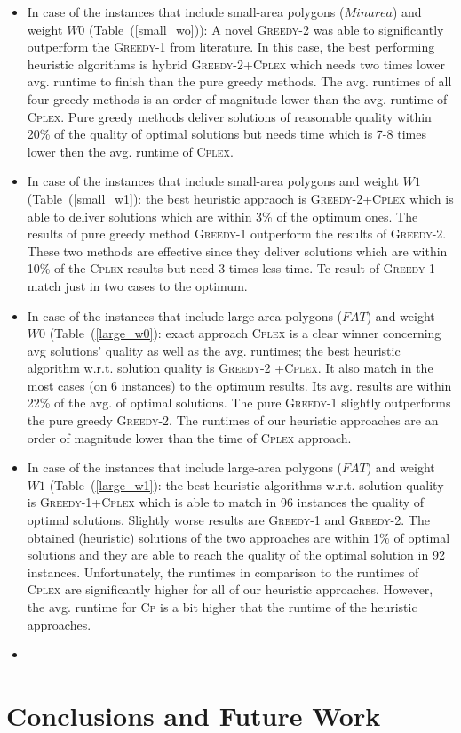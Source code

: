 \documentclass[runningheads,a4paper]{elsarticle}
\begin{document}
     \begin{itemize}
     	\item  In case of the instances that include small-area polygons ($Minarea$) and weight $W0$ (Table~(\ref{small_wo})): A novel \textsc{Greedy-2} was able to significantly outperform the \textsc{Greedy-1} from literature. In this case, the best performing heuristic algorithms is hybrid \textsc{Greedy-2+Cplex} which needs two times lower avg. runtime to finish than the pure greedy methods. The avg. runtimes of all four greedy methods is an order of magnitude lower than the avg. runtime of \textsc{Cplex}. Pure greedy methods deliver solutions of reasonable quality within 20\% of the quality of optimal solutions but needs time which is 7-8 times lower then the avg. runtime of \textsc{Cplex}. 
     	\item  In case of the instances that include small-area polygons and weight $W1$ (Table~(\ref{small_w1}): the best heuristic appraoch is \textsc{Greedy-2+Cplex} which is able to deliver solutions which are within 3\% of the optimum ones. 
     	The results of pure greedy method \textsc{Greedy-1} outperform the results of \textsc{Greedy-2}. These two methods are effective since they deliver solutions which are within 10\% of the \textsc{Cplex} results but need 3 times less time. Te result of \textsc{Greedy-1} match just in two cases to the optimum.
     	
     	\item In case of the instances that include large-area polygons ($FAT$) and weight $W0$ (Table~(\ref{large_w0}): exact approach \textsc{Cplex} is a clear winner concerning avg solutions' quality as well as the avg. runtimes;  the best heuristic algorithm w.r.t. solution quality is \textsc{Greedy-2 +Cplex}. It also match in the most cases (on 6 instances) to the optimum results. Its avg. results are within 22\% of the avg. of  optimal solutions.  The pure \textsc{Greedy-1} slightly outperforms the pure greedy \textsc{Greedy-2}.   The runtimes of our heuristic approaches are an order of magnitude lower than the time of \textsc{Cplex} approach. 
     	\item  In case of the instances that include large-area polygons ($FAT$) and weight $W1$ (Table~(\ref{large_w1}): the best heuristic algorithms w.r.t. solution quality is \textsc{Greedy-1+Cplex} which is able to match in 96 instances the quality of optimal solutions. Slightly worse results are \textsc{Greedy-1} and \textsc{Greedy-2}. The obtained (heuristic) solutions of the two approaches are within 1\% of optimal solutions and they are
     	able to reach the quality of the optimal solution in 92 instances. Unfortunately, the runtimes in comparison to the runtimes of \textsc{Cplex} are significantly higher for all of our heuristic approaches. However, the avg. runtime for \textsc{Cp} is a bit higher that the runtime of the heuristic approaches. 
     	\item {}
     \end{itemize}
    
	\section{Conclusions and Future Work}
	
	
	
	
	
	
	
\end{document}
